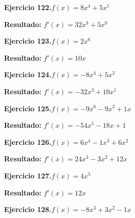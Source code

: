 \documentclass[10pt,a4paper]{article}
\begin{document}
\begin{ejbox}
\textbf{Ejercicio 122.}\quad $f(x) = 8x^{4} +5x^{1}$
\end{ejbox}

\begin{solbox}
\textbf{Resultado:} \(\displaystyle f'(x) = 32x^{3} +5x^{0}\)
\end{solbox}

\begin{ejbox}
\textbf{Ejercicio 123.}\quad $f(x) = 2x^{6}$
\end{ejbox}

\begin{solbox}
\textbf{Resultado:} \(\displaystyle f'(x) = 10x\)
\end{solbox}

\newpage
\begin{ejbox}
\textbf{Ejercicio 124.}\quad $f(x) = -8x^{4} +5x^{2}$
\end{ejbox}

\begin{solbox}
\textbf{Resultado:} \(\displaystyle f'(x) = -32x^{3} +10x^{1}\)
\end{solbox}

\begin{ejbox}
\textbf{Ejercicio 125.}\quad $f(x) = -9x^{6} -9x^2 +1x$
\end{ejbox}

\begin{solbox}
\textbf{Resultado:} \(\displaystyle f'(x) = -54x^{5} -18x +1\)
\end{solbox}

\begin{ejbox}
\textbf{Ejercicio 126.}\quad $f(x) = 6x^4 -1x^3 +6x^2$
\end{ejbox}

\begin{solbox}
\textbf{Resultado:} \(\displaystyle f'(x) = 24x^3 -3x^2 +12x\)
\end{solbox}

\newpage
\begin{ejbox}
\textbf{Ejercicio 127.}\quad $f(x) = 4x^{5}$
\end{ejbox}

\begin{solbox}
\textbf{Resultado:} \(\displaystyle f'(x) = 12x\)
\end{solbox}

\begin{ejbox}
\textbf{Ejercicio 128.}\quad $f(x) = -8x^3 +3x^2 -1x$
\end{ejbox}
\end{document}
